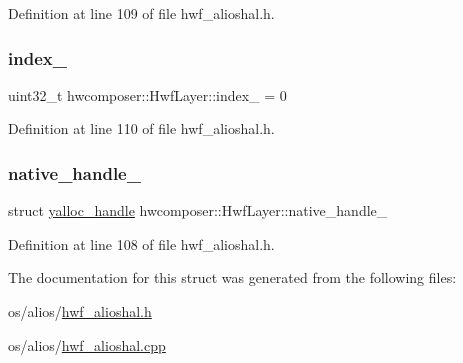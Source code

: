 Definition at line 109 of file hwf\+\_\+alioshal.\+h.

\mbox{\label{structhwcomposer_1_1HwfLayer_af8ca4030957aaef1c746b178592bb5cc}} 
\subsubsection{\texorpdfstring{index\+\_\+}{index\_}}
{\footnotesize\ttfamily uint32\+\_\+t hwcomposer\+::\+Hwf\+Layer\+::index\+\_\+ = 0}



Definition at line 110 of file hwf\+\_\+alioshal.\+h.

\mbox{\label{structhwcomposer_1_1HwfLayer_a6dc6b7acf0edab3cf5f49a9e3c389ce3}} 
\subsubsection{\texorpdfstring{native\+\_\+handle\+\_\+}{native\_handle\_}}
{\footnotesize\ttfamily struct \mbox{\hyperlink{structyalloc__handle}{yalloc\+\_\+handle}} hwcomposer\+::\+Hwf\+Layer\+::native\+\_\+handle\+\_\+}



Definition at line 108 of file hwf\+\_\+alioshal.\+h.



The documentation for this struct was generated from the following files\+:\begin{DoxyCompactItemize}
\item 
os/alios/\mbox{\hyperlink{hwf__alioshal_8h}{hwf\+\_\+alioshal.\+h}}\item 
os/alios/\mbox{\hyperlink{hwf__alioshal_8cpp}{hwf\+\_\+alioshal.\+cpp}}\end{DoxyCompactItemize}
